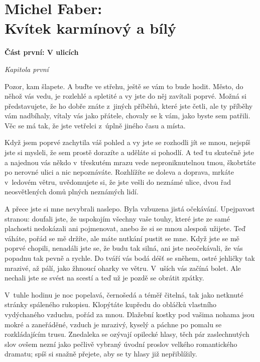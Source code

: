 \section{Michel Faber: \\ Kvítek karmínový a bílý}

\noindent
\textbf{Část první: V ulicích}

\medskip

\noindent
\textit{Kapitola první}

\medskip

\noindent
Pozor, kam šlapete. A buďte ve střehu, ještě se vám to bude hodit. Město, do něhož vás vedu, je rozlehlé a spletité a vy jste do něj zavítali poprvé. Možná si představujete, že ho dobře znáte z jiných příběhů, které jste četli, ale ty příběhy vám nadbíhaly, vítaly vás jako přátele, chovaly se k vám, jako byste sem patřili. Věc se má tak, že jste vetřelci z úplně jiného času a místa. 

Když jsem poprvé zachytila váš pohled a vy jste se rozhodli jít se mnou, nejspíš jste si mysleli, že sem prostě dorazíte a uděláte si pohodlí. A teď tu skutečně jste a najednou vás někdo v třeskutém mrazu vede neproniknutelnou tmou, škobrtáte po nerovné ulici a nic nepoznáváte. Rozhlížíte se doleva a doprava, mrkáte v ledovém větru, uvědomujete si, že jste vešli do neznámé ulice, dvou řad neosvětlených domů plných neznámých lidí. 

A přece jste si mne nevybrali naslepo. Byla vzbuzena jistá očekávání. Upejpavost stranou: doufali jste, že uspokojím všechny vaše touhy, které jste ze samé plachosti nedokázali ani pojmenovat, anebo že si se mnou alespoň užijete. Teď váháte, pořád se mě držíte, ale máte nutkání pustit se mne. Když jste se mě poprvé chopili, nenadáli jste se, že budu tak silná, ani jste neočekávali, že vás popadnu tak pevně a rychle. Do tváří vás bodá déšť se sněhem, ostré jehličky tak mrazivé, až pálí, jako žhnoucí oharky ve větru. V uších vás začíná bolet. Ale nechali jste se svést na scestí a teď už je pozdě se obrátit zpátky.

V tuhle hodinu je noc popelavá, černošedá a téměř čitelná, tak jako netknuté stránky spáleného rukopisu. Klopýtáte kupředu do obláčků vlastního vydýchaného vzduchu, pořád za mnou. Dlažební kostky pod vašima nohama jsou mokré a zaneřáděné, vzduch je mrazivý, kyselý a páchne po pomalu se rozkládajícím trusu. Znedaleka se ozývají opilecké hlasy, těch pár zaslechnutých slov ovšem nezní jako pečlivě vybraný úvodní proslov velkého romantického dramatu; spíš si snažně přejete, aby se ty hlasy již nepřiblížily. 

